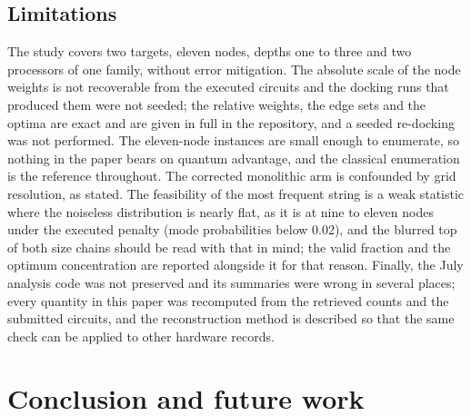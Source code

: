 \documentclass{iopjournal}
\begin{document}
\subsection{Limitations}
\label{sec:disc_limits}
The study covers two targets, eleven nodes, depths one to three and two processors of one family, without error mitigation. The absolute scale of the node weights is not recoverable from the executed circuits and the docking runs that produced them were not seeded; the relative weights, the edge sets and the optima are exact and are given in full in the repository, and a seeded re-docking was not performed. The eleven-node instances are small enough to enumerate, so nothing in the paper bears on quantum advantage, and the classical enumeration is the reference throughout. The corrected monolithic arm is confounded by grid resolution, as stated. The feasibility of the most frequent string is a weak statistic where the noiseless distribution is nearly flat, as it is at nine to eleven nodes under the executed penalty (mode probabilities below 0.02), and the blurred top of both size chains should be read with that in mind; the valid fraction and the optimum concentration are reported alongside it for that reason. Finally, the July analysis code was not preserved and its summaries were wrong in several places; every quantity in this paper was recomputed from the retrieved counts and the submitted circuits, and the reconstruction method is described so that the same check can be applied to other hardware records.

\section{Conclusion and future work}
\label{sec:conclusion}
\end{document}
